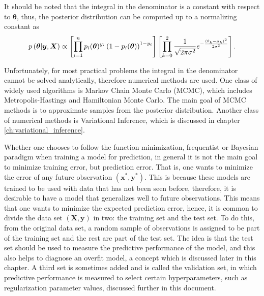 It should be noted that the integral in the denominator is a constant with respect to $\boldsymbol{\theta}$, thus, the posterior distribution can be computed up to a normalizing constant as
\begin{equation}
  p\left( \boldsymbol{\theta} | \boldsymbol{y}, \boldsymbol{X} \right) \propto
  \left[ \prod_{i = 1}^n  p_i(\boldsymbol{\theta})^{y_i}\left(1 - p_i(\boldsymbol{\theta}) \right)^{1 - y_i} \right]
  \left[ \prod_{k = 0}^2 \frac{1}{\sqrt{2 \pi \sigma^2}} e^{- \frac{(\theta_k - \mu_k)^2}{2\sigma^2}} \right].
\end{equation}

Unfortunately, for most practical problems the integral in the denominator cannot be solved analytically, therefore numerical methods are used. One class of widely used algorithms is Markov Chain Monte Carlo (MCMC), which includes Metropolis-Hastings and Hamiltonian Monte Carlo. The main goal of MCMC methods is to approximate samples from the posterior distribution. Another class of numerical methods is Variational Inference, which is discussed in chapter \ref{ch:variational_inference}.

Whether one chooses to follow the function minimization, frequentist or Bayesian paradigm when training a model for prediction, in general it is not the main goal to minimize training error, but prediction error. That is, one wants to minimize the error of any future observation $(\boldsymbol{x}^*, \boldsymbol{y}^*)$. This is because these models are trained to be used with data that has not been seen before, therefore, it is desirable to have a model that generalizes well to future observations. This means that one wants to minimize the expected prediction error, hence, it is common to divide the data set $(\boldsymbol{X}, \boldsymbol{y})$ in two: the training set and the test set. To do this, from the original data set, a random sample of observations is assigned to be part of the training set and the rest are part of the test set. The idea is that the test set should be used to measure the predictive performance of the model, and this also helps to diagnose an overfit model, a concept which is discussed later in this chapter. A third set is sometimes added and is called the validation set, in which predictive performance is measured to select certain hyperparameters, such as regularization parameter values, discussed further in this document.

